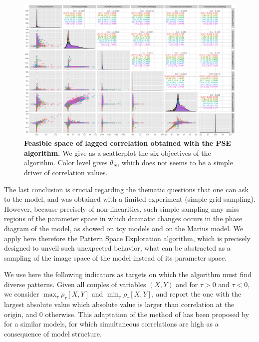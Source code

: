 \begin{figure}
	\includegraphics[width=\textwidth]{figures/scatterplot_colornwThreshold.png}
	\caption{\textbf{Feasible space of lagged correlation obtained with the PSE algorithm.} We give as a scatterplot the six objectives of the algorithm. Color level gives $\theta_N$, which does not seems to be a simple driver of correlation values.\label{fig:pse}}
\end{figure}


The last conclusion is crucial regarding the thematic questions that one can ask to the model, and was obtained with a limited experiment (simple grid sampling). However, because precisely of non-linearities, such simple sampling may miss regions of the parameter space in which dramatic changes occurs in the phase diagram of the model, as \cite{cherel2015beyond} showed on toy models and on the Marius model. We apply here therefore the Pattern Space Exploration algorithm, which is precisely designed to unveil such unexpected behavior, what can be abstracted as a sampling of the image space of the model instead of its parameter space.

We use here the following indicators as targets on which the algorithm must find diverse patterns. Given all couples of variables $(X,Y)$ and for $\tau > 0$ and $\tau < 0$, we consider $\max_{\tau} \rho_{\tau}\left[X,Y\right]$ and $\min_{\tau} \rho_{\tau}\left[X,Y\right]$, and report the one with the largest absolute value which absolute value is larger than correlation at the origin, and 0 otherwise. This adaptation of the method of \cite{raimbault2017identification} has been proposed by \cite{2018arXiv180409430R} for a similar models, for which simultaneous correlations are high as a consequence of model structure.

